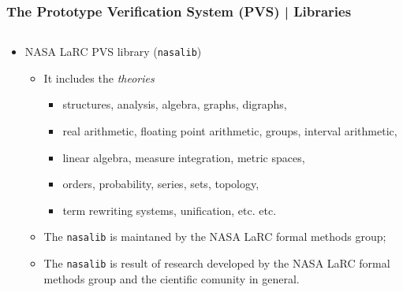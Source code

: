 \documentclass[10pt]{beamer}
\begin{document}
\begin{frame}
\frametitle{The Prototype Verification System (PVS) | Libraries }
\begin{columns}
\begin{column}{11cm}
\begin{itemize}
\item {\color{red}NASA LaRC PVS library ({\tt nasalib})} 
\begin{itemize}
\item It includes the \emph{theories}
\begin{itemize}
\item {\color{blue}structures}, analysis, algebra, graphs, {\color{blue}digraphs}, 
\item real arithmetic, floating point arithmetic, {\color{blue}groups}, interval arithmetic,
\item linear algebra, measure integration, metric spaces, 
\item orders, probability, series, sets, topology, 
\item {\color{blue}term rewriting systems}, {\color{blue}unification}, etc. etc.
\end{itemize}
\item The {\tt nasalib} is maintaned by the NASA LaRC formal methods group;
\item The {\tt nasalib} is result of research developed by the
  NASA LaRC formal methods group and the cientific comunity in
  general.
\end{itemize}
\end{itemize}

\end{column}
\end{columns}
\end{frame}
\end{document}
